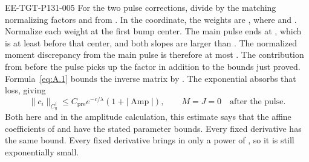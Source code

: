 \begin{EESegment}{EE-TGT-P131-005}
For the two pulse corrections, divide by the matching normalizing factors
 and
 from
. In the  coordinate, the weights are
, where
 and
. Normalize each weight at the first bump center.
The main pulse ends at , which is at least
 before that center, and both slopes are larger than
. The normalized moment discrepancy from the main pulse is
therefore at most
. The contribution from
before the pulse picks up the factor
 in addition to the bounds just proved.
Formula~\eqref{eq:A.1} bounds the inverse matrix by
. The exponential absorbs that loss, giving
\begin{equation}
\lVert c_i\rVert_{C_\eta^1}
 \le C_{\mathrm{pre}}e^{-c/\lambda}(1+|\operatorname{Amp}|),
\qquad
M=J=0\quad\text{after the pulse}.
\tag{A.15}\label{eq:A.15}
\end{equation}
Both here and in the amplitude calculation, this estimate says that the affine coefficients
of  and  have the
stated parameter bounds. Every fixed  derivative has the same
bound. Every fixed  derivative brings in only a power of
, so it is still exponentially small.
\end{EESegment}

